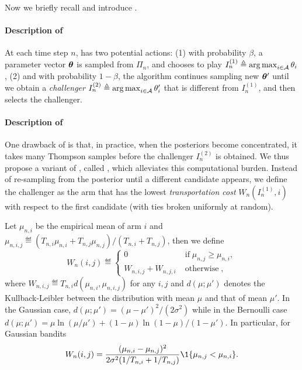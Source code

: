 Now we briefly recall \TTTS and introduce \TCC.

\paragraph{Description of \TTTS} At each time step $n$, \TTTS has two potential actions: (1) with probability $\beta$, a parameter vector ${\boldsymbol \theta}$ is sampled from $\Pi_{n}$, and \TTTS chooses to play $I_n^{(1)} \triangleq \operatorname*{arg\,max}_{i\in\mathcal{A}} \theta_i$, (2) and with probability $1-\beta$, the algorithm continues sampling new ${\boldsymbol \theta}'$ until we obtain a \emph{challenger} $I_n^{(2)} \triangleq \operatorname*{arg\,max}_{i\in\mathcal{A}} \theta_i'$ that is different from $I_n^{(1)}$, and \TTTS then selects the challenger.

\paragraph{Description of \TCC} One drawback of \TTTS is that, in practice, when the posteriors become concentrated, it takes many Thompson samples before the challenger $I_n^{(2)}$ is obtained. We thus propose a variant of \TTTS, called \TCC, which alleviates this computational burden. Instead of re-sampling from the posterior until a different candidate appears, we define the challenger as the arm that has the lowest \emph{transportation cost} $W_n(I_n^{(1)},i)$ with respect to the first candidate (with ties broken uniformly at random). 

Let $\mu_{n,i}$ be the empirical mean of arm $i$ and $\mu_{n,i,j} \eqdef (T_{n,i}\mu_{n,i} +T_{n,j}\mu_{n,j})/(T_{n,i}+T_{n,j})$, then we define
\begin{equation}\label{def:Transportation}
	W_n(i,j) \eqdef
	\left\{ \begin{array}{ll}
				0 & \operatorname{if} \mu_{n,j} \geq \mu_{n,i},\\
				W_{n,i,j}+W_{n,j,i} & \operatorname{otherwise},
			\end{array}\right.
\end{equation}
where $W_{n,i,j}\eqdef T_{n,i} d\left(\mu_{n,i},\mu_{n,i,j}\right)$ for any $i,j$ and $d(\mu ; \mu' )$ denotes the Kullback-Leibler between the distribution with mean $\mu$ and that of mean $\mu'$. In the Gaussian case, $d(\mu;\mu') = (\mu-\mu')^2/(2\sigma^2)$ while in the Bernoulli case $d(\mu;\mu') = \mu \ln (\mu/\mu') + (1-\mu)\ln (1-\mu)/(1-\mu')$.
In particular, for Gaussian bandits 
\[
    W_n(i,j) = \dfrac{(\mu_{n,i}-\mu_{n,j})^2}{2\sigma^2(1/T_{n,i}+1/T_{n,j})}\1\{\mu_{n,j}<\mu_{n,i}\}.
\]


